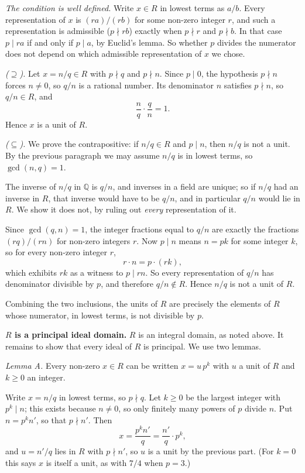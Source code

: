 \documentclass[11pt]{article}
\begin{document}
\begin{solution}
  \emph{The condition is well defined.} Write $x \in R$ in lowest terms as
  $a/b$. Every representation of $x$ is $(ra)/(rb)$ for some non-zero integer
  $r$, and such a representation is admissible ($p \nmid rb$) exactly when
  $p \nmid r$ and $p \nmid b$. In that case $p \mid ra$ if and only if
  $p \mid a$, by Euclid's lemma. So whether $p$ divides the numerator does not
  depend on which admissible representation of $x$ we chose.

  \emph{($\supseteq$).} Let $x = n/q \in R$ with $p \nmid q$ and $p \nmid n$.
  Since $p \mid 0$, the hypothesis $p \nmid n$ forces $n \neq 0$, so $q/n$ is
  a rational number. Its denominator $n$ satisfies $p \nmid n$, so
  $q/n \in R$, and
  \[
    \frac{n}{q} \cdot \frac{q}{n} = 1 .
  \]
  Hence $x$ is a unit of $R$.

  \emph{($\subseteq$).} We prove the contrapositive: if $n/q \in R$ and
  $p \mid n$, then $n/q$ is not a unit. By the previous paragraph we may
  assume $n/q$ is in lowest terms, so $\gcd(n,q) = 1$.

  The inverse of $n/q$ in $\mathbb{Q}$ is $q/n$, and inverses in a field are
  unique; so if $n/q$ had an inverse in $R$, that inverse would have to be
  $q/n$, and in particular $q/n$ would lie in $R$. We show it does not, by
  ruling out \emph{every} representation of it.

  Since $\gcd(q,n) = 1$, the integer fractions equal to $q/n$ are exactly the
  fractions $(rq)/(rn)$ for non-zero integers $r$. Now $p \mid n$ means
  $n = pk$ for some integer $k$, so for every non-zero integer $r$,
  \[
    r \cdot n = p \cdot (rk) ,
  \]
  which exhibits $rk$ as a witness to $p \mid rn$. So every representation of
  $q/n$ has denominator divisible by $p$, and therefore $q/n \notin R$. Hence
  $n/q$ is not a unit of $R$.

  Combining the two inclusions, the units of $R$ are precisely the elements
  of $R$ whose numerator, in lowest terms, is not divisible by $p$.

  \medskip
  \textbf{$R$ is a principal ideal domain.} $R$ is an integral domain, as
  noted above. It remains to show that every ideal of $R$ is principal. We
  use two lemmas.

  \emph{Lemma A.} Every non-zero $x \in R$ can be written $x = u\,p^{k}$ with
  $u$ a unit of $R$ and $k \geq 0$ an integer.

  Write $x = n/q$ in lowest terms, so $p \nmid q$. Let $k \geq 0$ be the
  largest integer with $p^{k} \mid n$; this exists because $n \neq 0$, so only
  finitely many powers of $p$ divide $n$. Put $n = p^{k}n'$, so that
  $p \nmid n'$. Then
  \[
    x = \frac{p^{k}n'}{q} = \frac{n'}{q} \cdot p^{k} ,
  \]
  and $u = n'/q$ lies in $R$ with $p \nmid n'$, so $u$ is a unit by the
  previous part. (For $k = 0$ this says $x$ is itself a unit, as with
  $7/4$ when $p = 3$.)


\end{solution}
\end{document}
